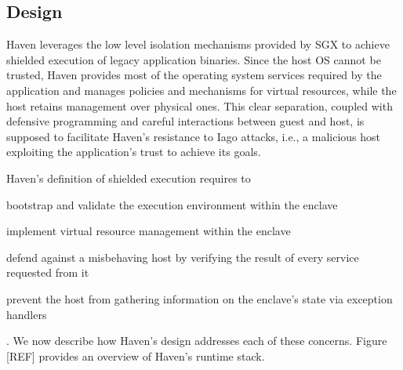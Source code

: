 \subsection{Design}
%
%
%
Haven leverages the low level isolation mechanisms provided by SGX to achieve shielded execution of legacy application binaries.
Since the host OS cannot be trusted, Haven provides most of the operating system services required by the application and manages policies and mechanisms for virtual resources, while the host retains management over physical ones.
This clear separation, coupled with defensive programming and careful interactions between guest and host, is supposed to facilitate Haven's resistance to Iago attacks, i.e., a malicious host exploiting the application's trust to achieve its goals.

Haven's definition of shielded execution requires to
\begin{enumerate*}
	\item bootstrap and validate the execution environment within the enclave
	\item implement virtual resource management within the enclave
	\item defend against a misbehaving host by verifying the result of every service requested from it
	\item prevent the host from gathering information on the enclave's state via exception handlers
\end{enumerate*}.
We now describe how Haven's design addresses each of these concerns.
Figure [REF] provides an overview of Haven's runtime stack.

